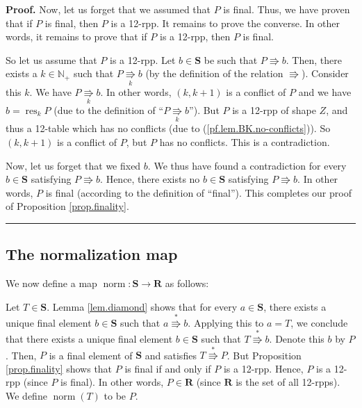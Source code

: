 \documentclass[numbers=enddot,12pt,final,onecolumn,notitlepage]{scrartcl}%
\theoremstyle{definition}
\newenvironment{proof}[1][Proof]{\noindent\textbf{#1.} }{\ \rule{0.5em}{0.5em}}
\begin{document}
\begin{proof}
Now, let us forget that we assumed that $P$ is final. Thus, we have proven
that if $P$ is final, then $P$ is a 12-rpp. It remains to prove the converse.
In other words, it remains to prove that if $P$ is a 12-rpp, then $P$ is final.

So let us assume that $P$ is a 12-rpp. Let $b\in\mathbf{S}$ be such that
$P\Rrightarrow b$. Then, there exists a $k\in\mathbb{N}_{+}$ such that
$P\underset{k}{\Rrightarrow}b$ (by the definition of the relation
$\Rrightarrow$). Consider this $k$. We have $P\underset{k}{\Rrightarrow}b$. In
other words, $\left(  k,k+1\right)  $ is a conflict of $P$ and we have
$b=\operatorname*{res}\nolimits_{k}P$ (due to the definition of
\textquotedblleft$P\underset{k}{\Rrightarrow}b$\textquotedblright). But $P$ is
a 12-rpp of shape $Z$, and thus a 12-table which has no conflicts (due to
(\ref{pf.lem.BK.no-conflicts})). So $\left(  k,k+1\right)  $ is a conflict of
$P$, but $P$ has no conflicts. This is a contradiction.

Now, let us forget that we fixed $b$. We thus have found a contradiction for
every $b\in\mathbf{S}$ satisfying $P\Rrightarrow b$. Hence, there exists no
$b\in\mathbf{S}$ satisfying $P\Rrightarrow b$. In other words, $P$ is final
(according to the definition of \textquotedblleft final\textquotedblright).
This completes our proof of Proposition \ref{prop.finality}.
\end{proof}

\subsection{The normalization map}

We now define a map $\operatorname*{norm}:\mathbf{S}\rightarrow\mathbf{R}$ as follows:

Let $T\in\mathbf{S}$. Lemma \ref{lem.diamond} shows that for every
$a\in\mathbf{S}$, there exists a unique final element $b\in\mathbf{S}$ such
that $a\overset{\ast}{\Rrightarrow}b$. Applying this to $a=T$, we conclude
that there exists a unique final element $b\in\mathbf{S}$ such that
$T\overset{\ast}{\Rrightarrow}b$. Denote this $b$ by $P$. Then, $P$ is a final
element of $\mathbf{S}$ and satisfies $T\overset{\ast}{\Rrightarrow}P$. But
Proposition \ref{prop.finality} shows that $P$ is final if and only if $P$ is
a 12-rpp. Hence, $P$ is a 12-rpp (since $P$ is final). In other words,
$P\in\mathbf{R}$ (since $\mathbf{R}$ is the set of all 12-rpps). We define
$\operatorname*{norm}\left(  T\right)  $ to be $P$.
\end{document}
